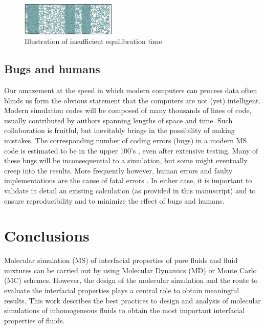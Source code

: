 \documentclass[9pt,bestpractices]{livecoms}
\begin{document}
\begin{figure}
\includegraphics[width=0.4\textwidth]{gfx/image77.png}
\caption{Illustration of insufficient equilibration time}
\label{fig:26}
\end{figure}

\subsection{Bugs and humans}

Our amazement at the speed in which modern computers can process data often
blinds us form the obvious statement that the computers are not (yet)
intelligent. Modern simulation codes will be composed of many thousands of
lines of code, usually contributed by authors spanning lengths of space and
time. Such collaboration is fruitful, but inevitably brings in the possibility
of making mistakes. The corresponding number of coding errors (bugs) in
a modern MS code is estimated to be in the upper 100's \citep{schappals2017},
even after extensive
testing. Many of these bugs will be inconsequential to a simulation, but some
might eventually creep into the results. More frequently however, human errors
and faulty implementations are the cause of fatal errors
\citep{wong2016}. In either case, it is important to validate in
detail an existing calculation (as provided in this manuscript) and to ensure
reproducibility and to minimize the effect of bugs and humans.  

\section{Conclusions}
Molecular simulation (MS) of interfacial properties of pure fluids and fluid
mixtures can be carried out by using Molecular Dynamics (MD) or Monte Carlo
(MC) schemes. However, the design of the molecular simulation and the route to
evaluate the interfacial properties plays a central role to obtain meaningful
results. This work describes the best practices to design and analysis of
molecular simulations of inhomogeneous fluids to obtain the most important
interfacial properties of fluids.
\end{document}
